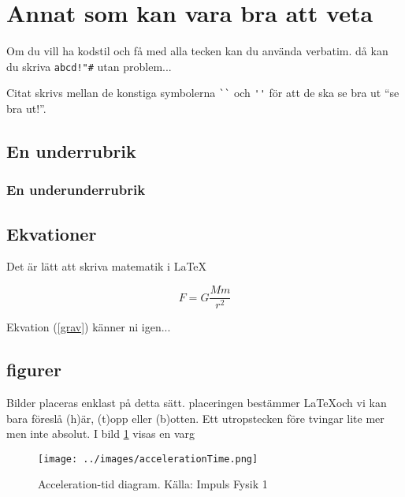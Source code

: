 \documentclass[11p]{article}
\begin{document}
    \section{Annat som kan vara bra att veta}
    Om du vill ha kodstil och få med alla tecken kan du använda verbatim. då kan du skriva \verb|abcd!"#| utan problem...

    Citat skrivs mellan de konstiga symbolerna \verb|``| och \verb|''| för att de ska se bra ut ``se bra ut!''.
    \subsection{En underrubrik}
    \subsubsection{En underunderrubrik}
    \subsection{Ekvationer}
    Det är lätt att skriva matematik i \LaTeX

    \begin{equation}
        F = G \frac{M m}{r^2}
        \label{grav}
    \end{equation}

    Ekvation (\ref{grav}) känner ni igen...

    \subsection{figurer}
    Bilder placeras enklast på detta sätt. placeringen bestämmer \LaTeX och vi kan bara föreslå (h)är, (t)opp eller (b)otten. Ett utropstecken före tvingar lite mer men inte absolut. I bild \ref{varg} visas en varg
    \begin{figure}[!h]
        \texttt{[image: ../images/accelerationTime.png]}
        \caption{Acceleration-tid diagram. Källa: Impuls Fysik 1}
        \label{varg}
    \end{figure}
    \printbibliography
\end{document}
